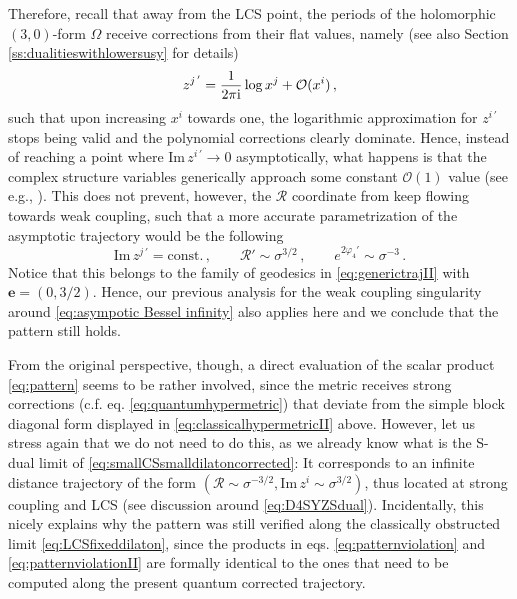 Therefore, recall that away from the LCS point, the periods of the holomorphic $(3,0)$-form $\Omega$ receive corrections from their flat values, namely \cite{B_hm_2000, Hori:2003ic} (see also Section \ref{ss:dualitieswithlowersusy} for details)
%
\begin{equation}\label{eq:analyticCSvariables}
	z^{j\, '} = \frac{1}{2\pi {\rm i}} \log x^j + \mathcal{O}(x^i)\, ,
\end{equation}
%
such that upon increasing $x^i$ towards one, the logarithmic approximation for $z^{i\, '}$ stops being valid and the polynomial corrections clearly dominate. Hence, instead of reaching a point where $\text{Im}\, z^{i\, '} \to 0$ asymptotically, what happens is that the complex structure variables generically approach some constant $\mathcal{O}(1)$ value (see e.g., \cite{Blumenhagen:2018nts,Joshi:2019nzi,Alvarez-Garcia:2021mzv,Cota:2023uir}). %
This does not prevent, however, the $\mathcal{R}$ coordinate from keep flowing towards weak coupling, such that a more accurate parametrization of the asymptotic trajectory would be the following
%
\begin{equation}\label{eq:smallCSsmalldilatoncorrected}
	\text{Im}\, z^{j\, '} = \text{const.}\, , \qquad \mathcal{R}' \sim \sigma^{3/2}\, , \qquad e^{2\varphi_4'} \sim \sigma^{-3}\, .
\end{equation}
%
Notice that this belongs to the family of geodesics in \eqref{eq:generictrajII} with $\mathbf{e}=(0, 3/2)$. Hence, our previous analysis for the weak coupling singularity around \eqref{eq:asympotic Bessel infinity} also applies here and we conclude that the pattern still holds.
	
From the original perspective, though, a direct evaluation of the scalar product \eqref{eq:pattern} seems to be rather involved, since the metric receives strong corrections (c.f. eq. \eqref{eq:quantumhypermetric}) that deviate from the simple block diagonal form displayed in \eqref{eq:classicalhypermetricII} above. However, let us stress again that we do not need to do this, as we already know what is the S-dual limit of \eqref{eq:smallCSsmalldilatoncorrected}: It corresponds to an infinite distance trajectory of the form $\left( \mathcal{R} \sim \sigma^{-3/2} , \text{Im}\, z^{i} \sim \sigma^{3/2} \right)$, thus located at strong coupling and LCS (see discussion around \eqref{eq:D4SYZSdual}). Incidentally, this nicely explains why the pattern was still verified along the classically obstructed limit \eqref{eq:LCSfixeddilaton}, since the products in eqs. \eqref{eq:patternviolation} and \eqref{eq:patternviolationII} are formally identical to the ones that need to be computed along the present quantum corrected trajectory.